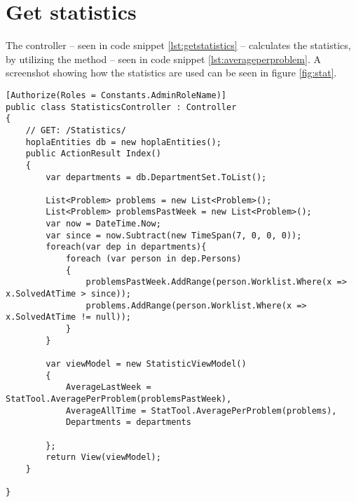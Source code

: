 \section{Get statistics}
\label{sec:getstatistics}

The  controller -- seen in code snippet \ref{lst:getstatistics} -- calculates the statistics, by utilizing the  method -- seen in code snippet \ref{lst:averageperproblem}. A screenshot showing how the statistics are used can be seen in figure \ref{fig:stat}.



\begin{lstlisting}[style=sourceCode, caption=\myCaption{The StatisticsController controller}, label=lst:getstatistics]
[Authorize(Roles = Constants.AdminRoleName)]
public class StatisticsController : Controller
{
    // GET: /Statistics/
    hoplaEntities db = new hoplaEntities();
    public ActionResult Index()
    {
        var departments = db.DepartmentSet.ToList();
        
        List<Problem> problems = new List<Problem>();
        List<Problem> problemsPastWeek = new List<Problem>();
        var now = DateTime.Now;
        var since = now.Subtract(new TimeSpan(7, 0, 0, 0));
        foreach(var dep in departments){
            foreach (var person in dep.Persons)
            {
                problemsPastWeek.AddRange(person.Worklist.Where(x => x.SolvedAtTime > since));
                problems.AddRange(person.Worklist.Where(x => x.SolvedAtTime != null));
            }
        }

        var viewModel = new StatisticViewModel()
        {
            AverageLastWeek = StatTool.AveragePerProblem(problemsPastWeek),
            AverageAllTime = StatTool.AveragePerProblem(problems),
            Departments = departments
            
        };
        return View(viewModel);
    }

}
\end{lstlisting}


